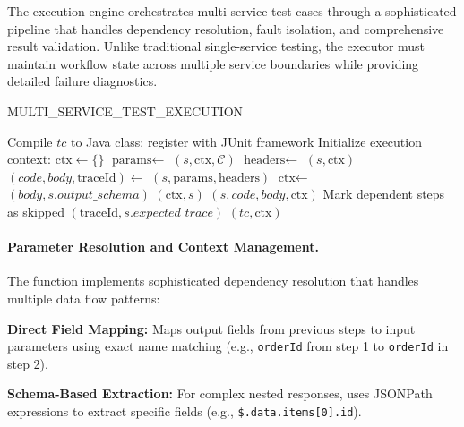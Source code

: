 The execution engine orchestrates multi-service test cases through a
sophisticated pipeline that handles dependency resolution, fault isolation,
and comprehensive result validation.  Unlike traditional single-service
testing, the executor must maintain workflow state across multiple service
boundaries while providing detailed failure diagnostics.

\begin{algorithm}[tb]
\caption{MULTI\_SERVICE\_TEST\_EXECUTION}\label{alg:execute}
\footnotesize
\begin{algorithmic}[1]
\Require{}
\Ensure{}
    \State Compile $tc$ to Java class; register with JUnit framework
    \State Initialize execution context: $\text{ctx} \gets \{\}$
        \State $\text{params} \gets$ $(s, \text{ctx}, \mathcal{C})$
        \State $\text{headers} \gets$ $(s, \text{ctx})$
        \State $(code, body, \text{traceId}) \gets$ $(s, \text{params}, \text{headers})$
            \State $\text{ctx} \gets$ $(body, s.output\_schema)$
            \State {}$(\text{ctx}, s)$
        \Else
            \State {}$(s, code, body, \text{ctx})$
            \State Mark dependent steps as skipped
        \EndIf
            \State {}$(\text{traceId}, s.expected\_trace)$
        \EndIf
    \EndFor
    \State {}$(tc, \text{ctx})$
\EndFor
\end{algorithmic}
\end{algorithm}

\paragraph{Parameter Resolution and Context Management.}
The  function implements sophisticated
dependency resolution that handles multiple data flow patterns:

\textbf{Direct Field Mapping:} Maps output fields from previous steps
to input parameters using exact name matching (e.g., \texttt{orderId}
from step 1 to \texttt{orderId} in step 2).

\textbf{Schema-Based Extraction:} For complex nested responses, uses
JSONPath expressions to extract specific fields (e.g.,
\texttt{\$.data.items[0].id}).

